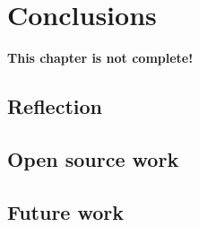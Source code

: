 
\chapter{Conclusions}
\label{ch:conclusions} %

\textbf{This chapter is not complete!}



\section{Reflection}
\label{sec:reflection} %

\section{Open source work}
\label{sec:open-source-work} %


\section{Future work}
\label{sec:future-work} %

